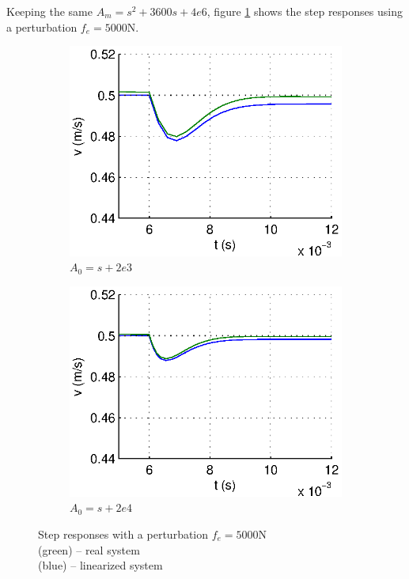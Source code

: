 Keeping the same $A_m = s^2 + 3600s + 4e6  $, figure \ref{stepPertu} shows the step responses using a perturbation $f_e = 5000\text{N}$.

\begin{figure}[hb]
  \centering
  \begin{subfigure}[b]{\linewidth}
   \includegraphics[width=\columnwidth]{fig/step_Fe_AmeqA0.eps}
   \caption{$A_0 = s+2e3$}
  \end{subfigure}
  \begin{subfigure}[b]{\linewidth}
  \includegraphics[width=\columnwidth]{fig/step_Fe_w0Eq10wm.eps}
   \caption{$A_0 = s + 2e4$}
  \end{subfigure}
 \caption{Step responses with a perturbation $f_e = 5000 \text{N}$\\ (green) -- real system \\ (blue) -- linearized system}
 \label{stepPertu}
\end{figure}

